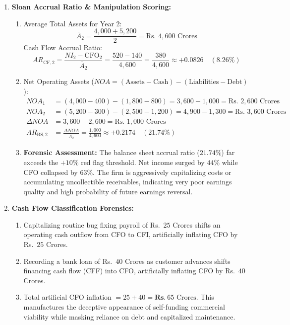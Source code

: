 \begin{enumerate}[label=\textbf{P3.\arabic*}]
    \item \textbf{Sloan Accrual Ratio \& Manipulation Scoring:}
    \begin{enumerate}[label=(\alph*)]
        \item Average Total Assets for Year 2:
        \begin{equation*}
        \bar{A}_2 = \frac{4{,}000 + 5{,}200}{2} = \text{Rs.~} 4{,}600\text{ Crores}
        \end{equation*}
        Cash Flow Accrual Ratio:
        \begin{equation*}
        AR_{\text{CF}, 2} = \frac{NI_2 - \text{CFO}_2}{\bar{A}_2} = \frac{520 - 140}{4{,}600} = \frac{380}{4{,}600} \approx \mathbf{+0.0826 \quad (8.26\%)}
        \end{equation*}
        \item Net Operating Assets ($NOA = (\text{Assets} - \text{Cash}) - (\text{Liabilities} - \text{Debt})$):
        \begin{align*}
        NOA_1 &= (4{,}000 - 400) - (1{,}800 - 800) = 3{,}600 - 1{,}000 = \text{Rs.~} 2{,}600\text{ Crores} \\
        NOA_2 &= (5{,}200 - 300) - (2{,}500 - 1{,}200) = 4{,}900 - 1{,}300 = \text{Rs.~} 3{,}600\text{ Crores} \\
        \Delta NOA &= 3{,}600 - 2{,}600 = \text{Rs.~} 1{,}000\text{ Crores} \\
        AR_{\text{BS}, 2} &= \frac{\Delta NOA}{\bar{A}_2} = \frac{1{,}000}{4{,}600} \approx \mathbf{+0.2174 \quad (21.74\%)}
        \end{align*}
        \item \textbf{Forensic Assessment:} The balance sheet accrual ratio ($21.74\%$) far exceeds the $+10\%$ red flag threshold. Net income surged by $44\%$ while CFO collapsed by $63\%$. The firm is aggressively capitalizing costs or accumulating uncollectible receivables, indicating very poor earnings quality and high probability of future earnings reversal.
    \end{enumerate}

    \item \textbf{Cash Flow Classification Forensics:}
    \begin{enumerate}[label=(\alph*)]
        \item Capitalizing routine bug fixing payroll of Rs.~$25$ Crores shifts an operating cash outflow from CFO to CFI, artificially inflating CFO by Rs.~$25$ Crores.
        \item Recording a bank loan of Rs.~$40$ Crores as customer advances shifts financing cash flow (CFF) into CFO, artificially inflating CFO by Rs.~$40$ Crores.
        \item Total artificial CFO inflation $= 25 + 40 = \mathbf{Rs.~} 65\text{ Crores}$. This manufactures the deceptive appearance of self-funding commercial viability while masking reliance on debt and capitalized maintenance.
    \end{enumerate}


\end{enumerate}
